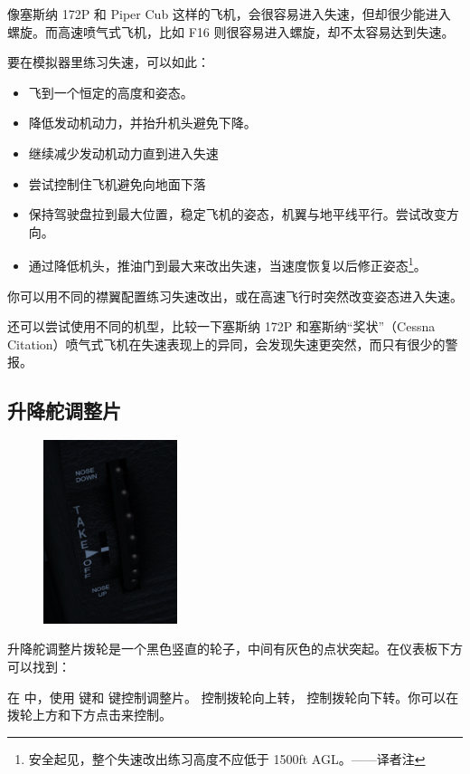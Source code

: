 像塞斯纳 172P 和 Piper Cub 这样的飞机，会很容易进入失速，但却很少能进入螺旋。而高速喷气式飞机，比如 F16 则很容易进入螺旋，却不太容易达到失速。

要在模拟器里练习失速，可以如此：
\begin{itemize}
    \item 飞到一个恒定的高度和姿态。
    \item 降低发动机动力，并抬升机头避免下降。
    \item 继续减少发动机动力直到进入失速
    \item 尝试控制住飞机避免向地面下落
    \item 保持驾驶盘拉到最大位置，稳定飞机的姿态，机翼与地平线平行。尝试改变方向。
    \item 通过降低机头，推油门到最大来改出失速，当速度恢复以后修正姿态\footnote{安全起见，整个失速改出练习高度不应低于 1500ft AGL。——译者注}。
\end{itemize}

你可以用不同的襟翼配置练习失速改出，或在高速飞行时突然改变姿态进入失速。

还可以尝试使用不同的机型，比较一下塞斯纳 172P 和塞斯纳“奖状”（Cessna Citation）喷气式飞机在失速表现上的异同，会发现失速更突然，而只有很少的警报。
\newpage
\subsection{升降舵调整片}
\label{sec:Trim}
\begin{figure}
  \includegraphics[width=0.35\textwidth]{img/basic_tutorial/trim}
\end{figure}

升降舵调整片拨轮是一个黑色竖直的轮子，中间有灰色的点状突起。在仪表板下方可以找到：

在 \FlightGear{} 中，使用  键和  键控制调整片。 控制拨轮向上转，  控制拨轮向下转。你可以在拨轮上方和下方点击来控制。

